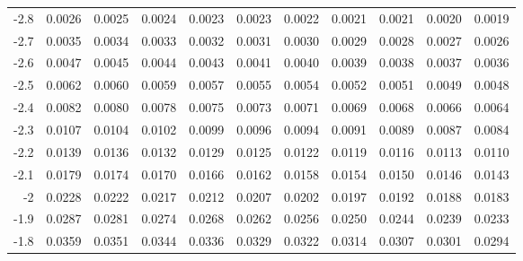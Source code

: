 \begin{center}
\begin{minipage}{5in}
\begin{center}
\begin{tabular}{|r|rrrrrrrrrr|}
\cellcolor{lightgray}	-2.8	&\cellcolor{lightgray}	0.0026	&\cellcolor{lightgray}	0.0025	&\cellcolor{lightgray}	0.0024	&\cellcolor{lightgray}	0.0023	&\cellcolor{lightgray}	0.0023	&\cellcolor{lightgray}	0.0022	&\cellcolor{lightgray}	0.0021	&\cellcolor{lightgray}	0.0021	&\cellcolor{lightgray}	0.0020	&\cellcolor{lightgray}	0.0019	\\
\cellcolor{lightgray}	-2.7	&\cellcolor{lightgray}	0.0035	&\cellcolor{lightgray}	0.0034	&\cellcolor{lightgray}	0.0033	&\cellcolor{lightgray}	0.0032	&\cellcolor{lightgray}	0.0031	&\cellcolor{lightgray}	0.0030	&\cellcolor{lightgray}	0.0029	&\cellcolor{lightgray}	0.0028	&\cellcolor{lightgray}	0.0027	&\cellcolor{lightgray}	0.0026	\\
\cellcolor{lightgray}	-2.6	&\cellcolor{lightgray}	0.0047	&\cellcolor{lightgray}	0.0045	&\cellcolor{lightgray}	0.0044	&\cellcolor{lightgray}	0.0043	&\cellcolor{lightgray}	0.0041	&\cellcolor{lightgray}	0.0040	&\cellcolor{lightgray}	0.0039	&\cellcolor{lightgray}	0.0038	&\cellcolor{lightgray}	0.0037	&\cellcolor{lightgray}	0.0036	\\
\cellcolor{lightgray}	-2.5	&\cellcolor{lightgray}	0.0062	&\cellcolor{lightgray}	0.0060	&\cellcolor{lightgray}	0.0059	&\cellcolor{lightgray}	0.0057	&\cellcolor{lightgray}	0.0055	&\cellcolor{lightgray}	0.0054	&\cellcolor{lightgray}	0.0052	&\cellcolor{lightgray}	0.0051	&\cellcolor{lightgray}	0.0049	&\cellcolor{lightgray}	0.0048	\\
	-2.4	&	0.0082	&	0.0080	&	0.0078	&	0.0075	&	0.0073	&	0.0071	&	0.0069	&	0.0068	&	0.0066	&	0.0064	\\
	-2.3	&	0.0107	&	0.0104	&	0.0102	&	0.0099	&	0.0096	&	0.0094	&	0.0091	&	0.0089	&	0.0087	&	0.0084	\\
	-2.2	&	0.0139	&	0.0136	&	0.0132	&	0.0129	&	0.0125	&	0.0122	&	0.0119	&	0.0116	&	0.0113	&	0.0110	\\
	-2.1	&	0.0179	&	0.0174	&	0.0170	&	0.0166	&	0.0162	&	0.0158	&	0.0154	&	0.0150	&	0.0146	&	0.0143	\\
	-2	&	0.0228	&	0.0222	&	0.0217	&	0.0212	&	0.0207	&	0.0202	&	0.0197	&	0.0192	&	0.0188	&	0.0183	\\
\cellcolor{lightgray}	-1.9	&\cellcolor{lightgray}	0.0287	&\cellcolor{lightgray}	0.0281	&\cellcolor{lightgray}	0.0274	&\cellcolor{lightgray}	0.0268	&\cellcolor{lightgray}	0.0262	&\cellcolor{lightgray}	0.0256	&\cellcolor{lightgray}	0.0250	&\cellcolor{lightgray}	0.0244	&\cellcolor{lightgray}	0.0239	&\cellcolor{lightgray}	0.0233	\\
\cellcolor{lightgray}	-1.8	&\cellcolor{lightgray}	0.0359	&\cellcolor{lightgray}	0.0351	&\cellcolor{lightgray}	0.0344	&\cellcolor{lightgray}	0.0336	&\cellcolor{lightgray}	0.0329	&\cellcolor{lightgray}	0.0322	&\cellcolor{lightgray}	0.0314	&\cellcolor{lightgray}	0.0307	&\cellcolor{lightgray}	0.0301	&\cellcolor{lightgray}	0.0294	\\

\end{tabular}
\end{center}
\end{minipage}
\end{center}
